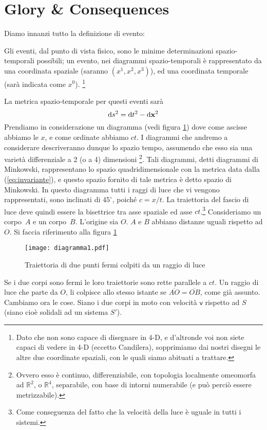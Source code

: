 \section{Glory \& Consequences}
Diamo innanzi tutto la definizione di evento:
\begin{definizione}
  Gli eventi, dal punto di vista fisico, sono le minime determinazioni
  spazio-temporali possibili; un evento, nei diagrammi
  spazio-temporali \`e rappresentato da una coordinata spaziale
  (saranno $(x^1,x^2,x^3)$), ed una coordinata temporale (sar\`a
  indicata come $x^0$).%
  \footnote{Dato che non sono capace di disegnare
    in 4-D, e d'altronde voi non siete capaci di vedere in 4-D
    (eccetto Candilera), sopprimiamo dai nostri disegni le altre due
    coordinate spaziali, con le quali siamo abituati a trattare.}
\end{definizione}
La metrica spazio-temporale per questi eventi sar\`a
\begin{equation}
  \label{eq:invariante}
  \mathrm{d} s^2 = \mathrm{d} t^2 - \mathrm{d} \mathbf{x}^2
\end{equation}
Prendiamo in considerazione un diagramma (vedi figura
\ref{fig:diagramma1}) dove come ascisse abbiamo le $x$, e come
ordinate abbiamo $ct$. I diagrammi che andremo a considerare
descriveranno dunque lo spazio tempo, assumendo che esso sia una
variet\`a differenziale a 2 (o a 4) dimensioni \footnote{Ovvero esso
  \`e continuo, differenziabile, con topologia localmente omeomorfa ad
  $\mathbb{R}^2$, o $\mathbb{R}^4$, separabile, con base di intorni
  numerabile (e pu\`o perci\`o essere metrizzabile).}. Tali diagrammi,
detti diagrammi di Minkowski,
rappresentano lo spazio quadridimensionale con la metrica data dalla
(\ref{eq:invariante}), e questo spazio fornito di tale metrica \`e
detto spazio di Minkowski. In questo
diagramma tutti i raggi di luce che vi vengono rappresentati, sono
inclinati di $45^{\circ}$, poich\'e $c = x / t$. La traiettoria del
fascio di luce deve quindi essere la bisettrice tra asse spaziale ed
asse $ct$.\footnote{Come conseguenza del fatto che la velocit\`a della
  luce \`e uguale in tutti i sistemi.} Consideriamo un corpo~$A$ e un
corpo~$B$. L'origine sia $O$. $A$ e $B$ abbiano distanze uguali
rispetto ad $O$. Si faccia riferimento alla figura
\ref{fig:diagramma1}

\begin{figure}[htbp]
  \begin{center}
       
    \texttt{[image: diagramma1.pdf]}
    \caption{Traiettoria di due punti fermi colpiti da un raggio di
      luce} \label{fig:diagramma1}
  \end{center}
\end{figure}
Se i due corpi sono fermi le loro traiettorie sono rette parallele a
$ct$. Un raggio di luce che parte da $O$, li colpisce allo stesso
istante se $\overline{AO}=\overline{OB}$, come gi\`a assunto. Cambiamo
ora le cose. Siano i due corpi in moto con velocit\`a
$\mathbf{\mathsf{v}}$ rispetto ad $S$ (siano cio\`e solidali ad un
sistema $S'$). %

